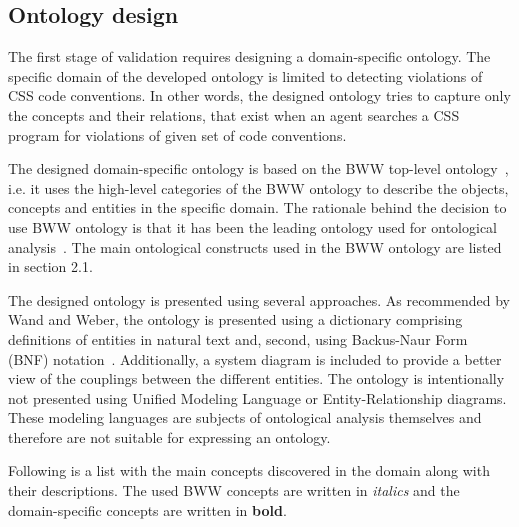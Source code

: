 \subsection{Ontology design}

The first stage of validation requires designing a domain-specific ontology.
The specific domain of the developed ontology is limited to detecting
violations of CSS code conventions. In other words, the designed ontology
tries to capture only the concepts and their relations, that exist when an
agent searches a CSS program for violations of given set of code conventions.

The designed domain-specific ontology is based on the BWW top-level
ontology~\cite{wand1990ontological}, i.e. it uses the high-level categories of
the BWW ontology to describe the objects, concepts and entities in the
specific domain. The rationale behind the decision to use BWW ontology is that
it has been the leading ontology used for ontological
analysis~\cite{moody2009physics}. The main ontological constructs used in the
BWW ontology are listed in section 2.1.

The designed ontology is presented using several approaches. As recommended by
Wand and Weber, the ontology is presented using a dictionary comprising
definitions of entities in natural text and, second, using Backus-Naur Form
(BNF) notation~\cite{wand1995deep,rosemann2002developing}. Additionally, a
system diagram is included to provide a better view of the couplings between
the different entities. The ontology is intentionally not presented using
Unified Modeling Language or Entity-Relationship diagrams. These modeling
languages are subjects of ontological analysis themselves and therefore are
not suitable for expressing an ontology.

Following is a list with the main concepts discovered in the domain along with
their descriptions. The used BWW concepts are written in \textit{italics} and
the domain-specific concepts are written in \textbf{bold}.

